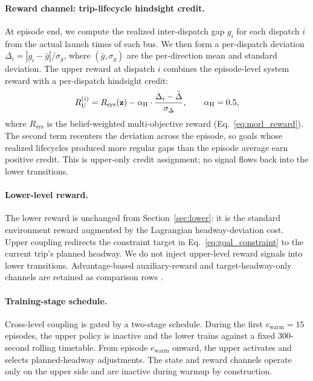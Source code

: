 \paragraph{Reward channel: trip-lifecycle hindsight credit.}
At episode end, we compute the realized inter-dispatch gap $g_i$ for each dispatch $i$ from the actual launch times of each bus. We then form a per-dispatch deviation $\Delta_i = |g_i - \bar{g}|/\sigma_g$, where $(\bar{g}, \sigma_g)$ are the per-direction mean and standard deviation. The upper reward at dispatch $i$ combines the episode-level system reward with a per-dispatch hindsight credit:
\begin{equation}
\label{eq:hindsight_reward}
    R_{\mathrm{U}}^{(i)} = R_{\mathrm{sys}}(\mathbf{z}) - \alpha_{\mathrm{H}} \cdot \frac{\Delta_i - \bar{\Delta}}{\sigma_{\Delta}}, \qquad \alpha_{\mathrm{H}} = 0.5,
\end{equation}
where $R_{\mathrm{sys}}$ is the belief-weighted multi-objective reward (Eq.~\ref{eq:morl_reward}). The second term recenters the deviation across the episode, so goals whose realized lifecycles produced more regular gaps than the episode average earn positive credit. This is upper-only credit assignment; no signal flows back into the lower transitions.

\paragraph{Lower-level reward.}
The lower reward is unchanged from Section~\ref{sec:lower}: it is the standard environment reward augmented by the Lagrangian headway-deviation cost. Upper coupling redirects the constraint target in Eq.~\ref{eq:goal_constraint} to the current trip's planned headway. We do not inject upper-level reward signals into lower transitions. Advantage-based auxiliary-reward and target-headway-only channels are retained as comparison rows \citep{li2019hierarchical,singh2024piper}.

\paragraph{Training-stage schedule.}
Cross-level coupling is gated by a two-stage schedule. During the first $e_{\mathrm{warm}} = 15$ episodes, the upper policy is inactive and the lower trains against a fixed 300-second rolling timetable. From episode $e_{\mathrm{warm}}$ onward, the upper activates and selects planned-headway adjustments. The state and reward channels operate only on the upper side and are inactive during warmup by construction.

